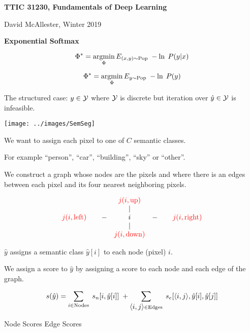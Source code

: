 




{\Huge

  \centerline{\bf TTIC 31230, Fundamentals of Deep Learning}
  \bigskip
  \centerline{David McAllester, Winter 2019}
  \vfill
  \vfill
  \centerline{\bf Exponential Softmax}
\vfill
\vfill
\vfill


\vfill
{\color{red}
$$\Phi^* = \operatorname*{argmin}_\Phi E_{(x,y) \sim \mathrm{Pop}}\;-\ln \;P(y|x)$$

\vfill
$$\Phi^* = \operatorname*{argmin}_\Phi E_{y \sim \mathrm{Pop}}\;-\ln \;P(y)$$
}

{\color{red} The structured case:} $y \in {\cal Y}$ where ${\cal Y}$ is discrete but {\color{red} iteration over $\hat{y} \in {\cal Y}$ is infeasible}.
\centerline{\texttt{[image: ../images/SemSeg]}}

\vfill
We want to assign each pixel to one of $C$ semantic classes.

\vfill
For example ``person'', ``car'', ``building'', ``sky'' or ``other''.


We construct a graph whose nodes are the pixels and where there is an edges between each pixel and its four nearest neighboring pixels.

\vfill
$$\begin{array}{ccccc}
 & & {\color{red} j(i,\mathrm{up})} \\
 & & | \\
 {\color{red} j(i,\mathrm{left})}\;\;\;\; & -& i & -& \;\;\;\;{\color{red} j(i,\mathrm{right})} \\
 & & | \\
 & & {\color{red} j(i,\mathrm{down})}
 \end{array}$$


$\hat{y} $ assigns a semantic class $\hat{y}[i]$ to each node (pixel) $i$.

\vfill
We assign a score to $\hat{y}$ by assigning a score to each node and each edge of the graph.

{\color{red} $$s(\hat{y}) = \sum_{i \in \mathrm{Nodes}}\; s_n[i,\hat{y}[i]]\; + \sum_{{\mbox{$\langle i,j\rangle$}} \in \mathrm{Edges}}\;s_e[{\mbox{$\langle i,j\rangle$}},\hat{y}[i],\hat{y}[j]]$$}
\centerline{Node Scores \hspace{6em}Edge Scores \hspace{3em}~}

}

